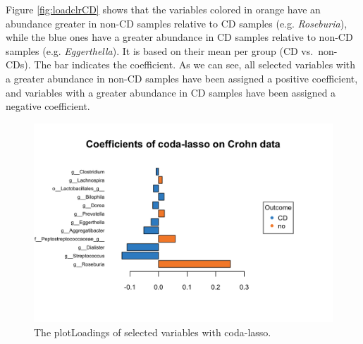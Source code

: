 \documentclass[openany]{book}
\newenvironment{Shaded}{\begin{snugshade}}{\end{snugshade}}
\newcommand{\KeywordTok}[1]{\textcolor[rgb]{0.13,0.29,0.53}{\textbf{#1}}}
\newcommand{\DataTypeTok}[1]{\textcolor[rgb]{0.13,0.29,0.53}{#1}}
\newcommand{\StringTok}[1]{\textcolor[rgb]{0.31,0.60,0.02}{#1}}
\newcommand{\CommentTok}[1]{\textcolor[rgb]{0.56,0.35,0.01}{\textit{#1}}}
\newcommand{\OperatorTok}[1]{\textcolor[rgb]{0.81,0.36,0.00}{\textbf{#1}}}
\newcommand{\NormalTok}[1]{#1}
\begin{document}
Figure \ref{fig:loadclrCD} shows that the variables colored in orange
have an abundance greater in non-CD samples relative to CD samples (e.g.
\emph{Roseburia}), while the blue ones have a greater abundance in CD
samples relative to non-CD samples (e.g. \emph{Eggerthella}). It is
based on their mean per group (CD vs.~non-CDs). The bar indicates the
coefficient. As we can see, all selected variables with a greater
abundance in non-CD samples have been assigned a positive coefficient,
and variables with a greater abundance in CD samples have been assigned
a negative coefficient.

\begin{Shaded}
\end{Shaded}

\begin{figure}

{\centering \includegraphics[width=1\linewidth]{./Generated_plots/loadcodaCD-1} 

}

\caption{The plotLoadings of selected variables with coda-lasso.}\label{fig:loadcodaCD}
\end{figure}
\end{document}

